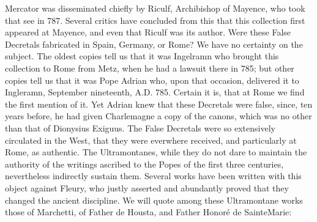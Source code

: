 Mercator was disseminated chiefly by Riculf, Archibishop of Mayence, who took that see in 787. Several critics have concluded from this that this collection first appeared at Mayence, and even that Riculf was its author. Were these False Decretals fabricated in Spain, Germany, or Rome? We have no certainty on the subject. The oldest copies tell us that it was Ingelramn who brought this collection to Rome from Metz, when he had a lawsuit there in 785; but other copies tell us that it was Pope Adrian who, upon that occasion, delivered it to Ingleramn, September nineteenth, A.D. 785. Certain it is, that at Rome we find the first mention of it. Yet Adrian knew that these Decretals were false, since, ten years before, he had given Charlemagne a copy of the canons, which was no other than that of Dionysius Exiguus. The False Decretals were so extensively circulated in the West, that they were everwhere received, and particularly at Rome, as authentic. The Ultramontanes, while they do not dare to maintain the authority of the writings ascribed to the Popes of the first three centuries, nevertheless indirectly sustain them. Several works have been written with this object against Fleury, who justly asserted and abundantly proved that they changed the ancient discipline. We will quote among these Ultramontane works those of Marchetti, of Father de Housta, and Father Honoré de SainteMarie:

